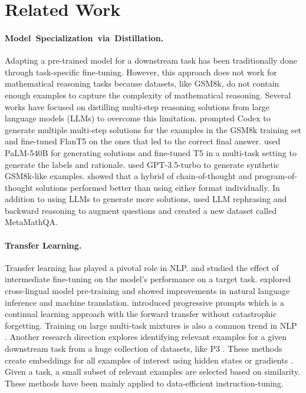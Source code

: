 \section{Related Work}
\paragraph{Model~Specialization~via~Distillation.}
Adapting a pre-trained model for a downstream task has been traditionally done through task-specific fine-tuning. However, this approach does not work for mathematical reasoning tasks because datasets, like GSM8k, do not contain enough examples to capture the complexity of mathematical reasoning. Several works have focused on distilling multi-step reasoning solutions from large language models (LLMs) to overcome this limitation. \citet{fu2023specializing} prompted Codex \citep{chen2021evaluating} to generate multiple multi-step solutions for the examples in the GSM8k training set and fine-tuned FlanT5 on the ones that led to the correct final answer. \citet{hsieh2023distilling} used PaLM-540B \citep{chowdhery2023palm} for generating solutions and fine-tuned T5 \citep{raffel2020exploring} in a multi-task setting to generate the labels and rationale. \citet{liu2023tinygsm} used GPT-3.5-turbo to generate synthetic GSM8k-like examples. \citet{yuemammoth} showed that a hybrid of chain-of-thought and program-of-thought solutions performed better than using either format individually. In addition to using LLMs to generate more solutions, \citet{yu2024metamath} used LLM rephrasing and backward reasoning to augment questions and created a new dataset called MetaMathQA.

\paragraph{Transfer Learning.}
Transfer learning has played a pivotal role in NLP. \citet{vu-etal-2020-exploring} and \citet{pruksachatkun2020intermediate} studied the effect of intermediate fine-tuning on the model's performance on a target task. \citet{conneau2019cross} explored cross-lingual model pre-training and showed improvements in natural language inference and machine translation. \citet{razdaibiedina2023progressive} introduced progressive prompts which is a continual learning approach with the forward transfer without catastrophic forgetting. Training on large multi-task mixtures is also a common trend in NLP \citep{aribandi2022ext5, wei2022finetuned, chung2024scaling, lambert2024t}. Another research direction explores identifying relevant examples for a given downstream task from a huge collection of datasets, like P3 \citep{sanh2021multitask}. These methods create embeddings for all examples of interest using hidden states \citep{ivison2023data} or gradients \citep{xia2024less}. Given a task, a small subset of relevant examples are selected based on similarity. These methods have been mainly applied to data-efficient instruction-tuning.
